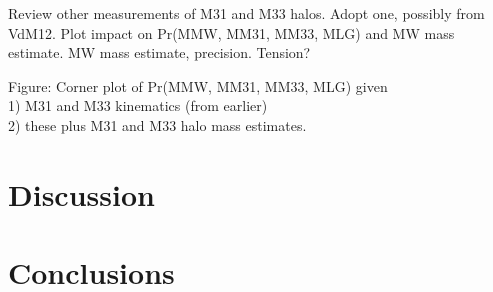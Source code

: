 \documentclass{emulateapj}
\begin{document}
Review other measurements of M31 and M33 halos. Adopt one, possibly from
VdM12. Plot impact on Pr(MMW, MM31, MM33, MLG) and MW mass estimate. MW mass
estimate, precision. Tension?

Figure: Corner plot of Pr(MMW, MM31, MM33, MLG) given\\
   1) M31 and M33 kinematics (from earlier) \\
   2) these plus M31 and M33 halo mass estimates. \\


% 


\section{Discussion}
\label{sec:discuss}


% 
% 
% 
% 
% 
% 
% 
% 

\section{Conclusions}
\label{sec:conclude}
\end{document}
